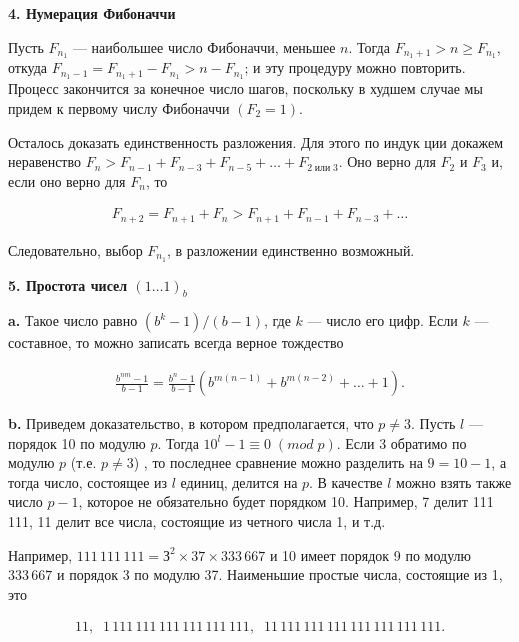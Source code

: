\documentclass{mai_book}
\begin{document}
\bigskip
\noindent\textbf{4. Нумерация Фибоначчи}

\medskip
Пусть $F_{n_1}$ --- наибольшее число Фибоначчи, меньшее $n$. Тогда
$F_{n_1+1}> n\geq F_{n_1}$, откуда $F_{n_1-1}=F_{n_1+1}-F_{n_1}> n-F_{n_1}$; и эту проце­дуру можно повторить. Процесс закончится за конечное число шагов,
поскольку в худшем случае мы придем к первому числу Фибоначчи $(F_2=1)$.

Осталось доказать единственность разложения. Для этого по индук­
ции докажем неравенство $F_n> F_{n-1}+F_{n-3}+F_{n-5}+\dots +F_{2\; \text{или}\; 3}$. 
Оно верно для $F_2$ и $F_3$ и, если оно верно для $F_n$, то


$$
\begin{aligned}
F_{n+2}=F_{n+1}+F_n>F_{n+1}+F_{n-1}+F_{n-3}+\dots
\end{aligned}
$$


\medskip
\noindent Следовательно, выбор $F_{n_1}$, в разложении единственно возможный.

\bigskip
\noindent\textbf{5. Простота чисел $(1\dots1)_b$}

\textbf{a.} Такое число равно $(b^k-1)/(b-1)$, где $k$ --- число его цифр. Если $k$ --- составное, то можно записать всегда верное тождество


$$
\begin{aligned}
\frac{b^{nm}-1}{b-1}=\frac{b^n-1}{b-1}(b^{m(n-1)}+b^{m(n-2)}+\dots+1).
\end{aligned}
$$


\medskip
\textbf{b.} Приведем доказательство, в котором предполагается, что $p\neq 3$.
Пусть $l$ --- порядок 10 по модулю $p$. 
Тогда $10^l-1\equiv 0\;(mod\;p)$. 
Если 3 обратимо по модулю $p$ (т.е. $p\neq 3$) , то последнее сравнение можно разделить на $9=10-1$, а тогда число, состоящее из $l$ единиц, делится на $p$. В качестве $l$ можно взять также число $p-1$, которое не обязатель­но будет порядком 10. Например, 7 делит 111$\,$111, 11 делит все числа, состоящие из четного числа 1, и т.д.

Например, $111\,111\,111 = З^2 \times 37 \times 333\,667$ и 10 имеет порядок 9 по модулю $333\,667$ и порядок 3 по модулю 37. 
Наименьшие простые числа, состоящие из 1, это


$$
\begin{aligned}
11,\;\; 1\,111\,111\,111\,111\,111\,111,\;\; 11\,111\,111\,111\,111\,111\,111\,111.
\end{aligned}
$$


\newpage

\end{document}

